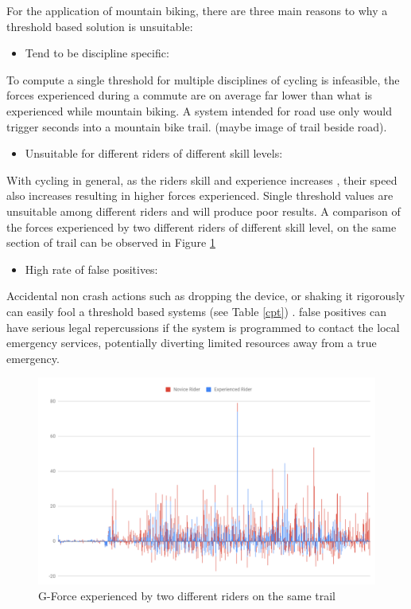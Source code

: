 For the application of mountain biking, there are three main reasons to why a threshold based solution is unsuitable:

\begin{itemize}
\item Tend to be discipline specific:
\end{itemize}
To compute a single threshold for multiple disciplines of cycling is infeasible, the forces experienced during a commute are on average far lower than what is experienced while mountain biking. A system intended for road use only would trigger seconds into a mountain bike trail. (maybe image of trail beside road).

\begin{itemize}
\item Unsuitable for different riders of different skill levels:
\end{itemize}
With cycling in general, as the riders skill and experience increases , their speed also increases resulting in higher forces experienced.
Single threshold values are unsuitable among different riders and will produce poor results. A comparison of the forces experienced by two different riders of different skill level, on the same section of trail can be observed in Figure \ref{forces} 

\begin{itemize}
\item High rate of false positives:
\end{itemize}
Accidental non crash actions such as dropping the device, or shaking it rigorously can easily fool a threshold based systems (see Table \ref{cpt}) . false positives can have serious legal repercussions if the system is programmed to contact the local emergency services, potentially diverting limited resources away from a true emergency.





\begin{figure}[h]
      \centering
      \includegraphics[scale = 1]{background/slowvfast.png}
      \caption{G-Force experienced by two different riders on the same trail}
      \label{forces}
\end{figure}




